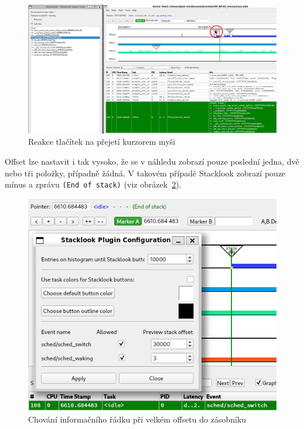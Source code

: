 \begin{figure}[p]\centering
    \includegraphics[width=140mm]{img/Stacklook/SlMouseHover}
    \caption{Reakce tlačítek na přejetí kurzorem myši}
    \label{SlMouseHover}
\end{figure}

Offset lze nastavit i tak vysoko, že se v náhledu zobrazí pouze poslední jedna, dvě nebo tři položky, případně žádná. V takovém případě Stacklook zobrazí pouze mínus a zprávu \texttt{(End of stack)} (viz obrázek~\ref{SlTooBigOffset}).

\begin{figure}[p]\centering
    \includegraphics[width=140mm]{img/Stacklook/SlTooBigOffset}
    \caption{Chování informačního řádku při velkém offsetu do zásobníku}
    \label{SlTooBigOffset}
\end{figure}

